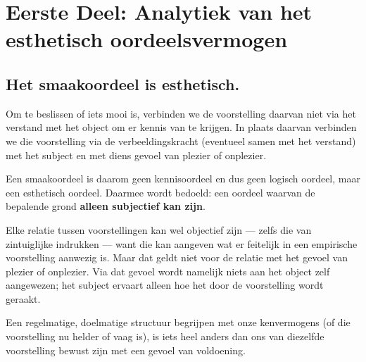 \chapter{Eerste Deel: Analytiek van het esthetisch oordeelsvermogen}



\section{Het smaakoordeel is esthetisch.}

Om te beslissen of iets mooi is, verbinden we de voorstelling daarvan niet via het verstand met het object om er kennis van te krijgen. In plaats daarvan verbinden we die voorstelling via de verbeeldingskracht (eventueel samen met het verstand) met het subject en met diens gevoel van plezier of onplezier.

Een smaakoordeel is daarom geen kennisoordeel en dus geen logisch oordeel, maar een esthetisch oordeel. Daarmee wordt bedoeld: een oordeel waarvan de bepalende grond \textbf{alleen subjectief kan zijn}.

Elke relatie tussen voorstellingen kan wel objectief zijn --- zelfs die van zintuiglijke indrukken --- want die kan aangeven wat er feitelijk in een empirische voorstelling aanwezig is. Maar dat geldt niet voor de relatie met het gevoel van plezier of onplezier. Via dat gevoel wordt namelijk niets aan het object zelf aangewezen; het subject ervaart alleen hoe het door de voorstelling wordt geraakt.

Een regelmatige, doelmatige structuur begrijpen met onze kenvermogens (of die voorstelling nu helder of vaag is), is iets heel anders dan ons van diezelfde voorstelling bewust zijn met een gevoel van voldoening.

